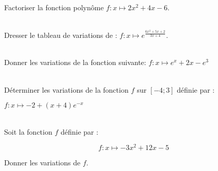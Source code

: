 \documentclass[12pt,fleqn]{report} %
\begin{document}
\begin{exercise}\label{Exercice 49}\text{ }\\
	Factoriser la fonction polynôme $f:x \mapsto 2 x^2 + 4x -6$.
\end{exercise}

\begin{exercise}\label{Exercice 12}\text{ }\\
	Dresser le tableau de variations de : $f : x \mapsto e^{\frac{6x^2+5x+2}{3x+4}}$.
\end{exercise}

\begin{exercise}\label{Exercice 15}\text{ }\\
	Donner les variations de la fonction suivante: $f : x \mapsto e^x+2x-e^3$
\end{exercise}

\begin{exercise}\label{Exercice 24}\text{ }\\
	Déterminer les variations de la fonction $f$ sur $[-4 ;3]$ définie par : 
	
	$f :x \mapsto -2+(x+4)e^{-x}$
\end{exercise}



\begin{exercise}\label{Exercice 29}\text{ }\\
	
	Soit la fonction $f$ définie par :
	
	\begin{equation*}
	f : x \mapsto -3x^2 + 12x - 5
	\end{equation*}
	
	Donner les variations de $f$.
\end{exercise}
\end{document}
